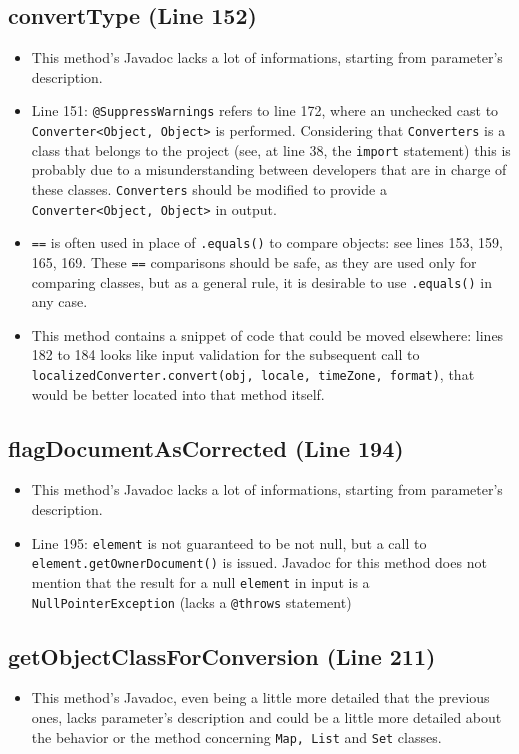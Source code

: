 \documentclass[11pt]{article} %
\begin{document}
\subsection{convertType (Line 152)}
\begin{itemize}
	\item This method's Javadoc lacks a lot of informations, starting from parameter's description.
	\item Line 151: \texttt{@SuppressWarnings} refers to line 172, where an unchecked cast to \texttt{Converter<Object, Object>} is performed. Considering that \texttt{Converters} is a class that belongs to the project (see, at line 38, the \texttt{import} statement) this is probably due to a misunderstanding between developers that are in charge of these classes. \texttt{Converters} should be modified to provide a \texttt{Converter<Object, Object>} in output.
	\item \texttt{==} is often used in place of \texttt{.equals()} to compare objects: see lines 153, 159, 165, 169. These \texttt{==} comparisons should be safe, as they are used only for comparing classes, but as a general rule, it is desirable to use \texttt{.equals()} in any case.
	\item This method contains a snippet of code that could be moved elsewhere: lines 182 to 184 looks like input validation for the subsequent call to \texttt{localizedConverter.convert(obj, locale, timeZone, format)}, that would be better located into that method itself.
\end{itemize}

\subsection{flagDocumentAsCorrected (Line 194)}
\begin{itemize}
	\item This method's Javadoc lacks a lot of informations, starting from parameter's description.
	\item Line 195: \texttt{element} is not guaranteed to be not null, but a call to \texttt{element.getOwnerDocument()} is issued. Javadoc for this method does not mention that the result for a null \texttt{element} in input is a \texttt{NullPointerException} (lacks a \texttt{@throws} statement)
\end{itemize}

\subsection{getObjectClassForConversion (Line 211)}
\begin{itemize}
	\item This method's Javadoc, even being a little more detailed that the previous ones, lacks parameter's description and could be a little more detailed about the behavior or the method concerning \texttt{Map, List} and \texttt{Set} classes.
\end{itemize}
\end{document}
